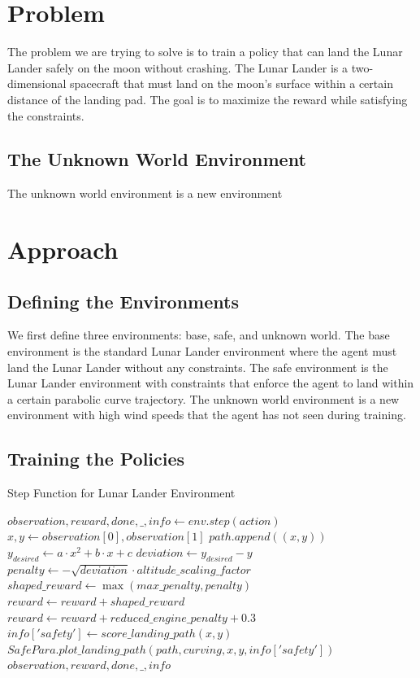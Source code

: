 \documentclass{article}
\begin{document}
\section{Problem}
The problem we are trying to solve is to train a policy that can land the Lunar Lander safely on the moon without crashing. The Lunar Lander is a two-dimensional spacecraft that must land on the moon's surface within a certain distance of the landing pad. The goal is to maximize the reward while satisfying the constraints. 

\subsection{The Unknown World Environment}
The unknown world environment is a new environment  

\section{Approach}
\subsection{Defining the Environments}
We first define three environments: base, safe, and unknown world. The base environment is the standard Lunar Lander environment where the agent must land the Lunar Lander without any constraints. The safe environment is the Lunar Lander environment with constraints that enforce the agent to land within a certain parabolic curve trajectory. The unknown world environment is a new environment with high wind speeds that the agent has not seen during training.



\subsection{Training the Policies}

\begin{algorithm}
  \caption{Step Function for Lunar Lander Environment}
  \begin{algorithmic}[1]
      \State $observation, reward, done, \_, info \gets env.step(action)$
      \State $x, y \gets observation[0], observation[1]$
      \State $path.append((x, y))$
      \State $y_{desired} \gets a \cdot x^2 + b \cdot x + c$
          \State $deviation \gets y_{desired} - y$
          \State $penalty \gets -\sqrt{deviation} \cdot altitude\_scaling\_factor$
          \State $shaped\_reward \gets \max(max\_penalty, penalty)$
          \State $reward \gets reward + shaped\_reward$
              \State $reward \gets reward + reduced\_engine\_penalty + 0.3$
          \EndIf
      \EndIf
          \State $info['safety'] \gets score\_landing\_path(x, y)$
      \EndIf
          \State $SafePara.plot\_landing\_path(path, curving, x, y, info['safety'])$
      \EndIf
      \State \Return $observation, reward, done, \_, info$
  \EndProcedure
  \end{algorithmic}
  \end{algorithm}
\end{document}
